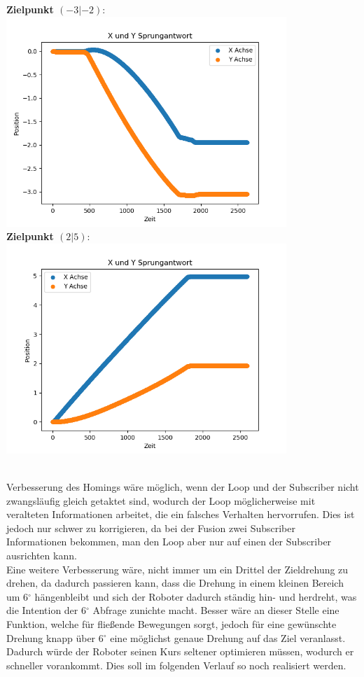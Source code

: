 \documentclass[12pt, a4paper]{report}
\begin{document}
\begin{centering}
{\textbf{Zielpunkt $(-3|-2):$}}\\
\includegraphics[width=300pt]{Sprungantwort1.png}\\
\newpage
{\textbf{Zielpunkt $(2|5):$}}\\
\includegraphics[width=300pt]{Sprungantwort2.png}\\
\end{centering}
~\\

Verbesserung des Homings wäre möglich, wenn der Loop und der Subscriber nicht zwangsläufig gleich getaktet sind, wodurch der Loop möglicherweise mit veralteten Informationen arbeitet, die ein falsches Verhalten hervorrufen. Dies ist jedoch nur schwer zu korrigieren, da bei der Fusion zwei Subscriber Informationen bekommen, man den Loop aber nur auf einen der Subscriber ausrichten kann.\\
Eine weitere Verbesserung wäre, nicht immer um ein Drittel der Zieldrehung zu drehen, da dadurch passieren kann, dass die Drehung in einem kleinen Bereich um 6$^\circ$ hängenbleibt und sich der Roboter dadurch ständig hin- und herdreht, was die Intention der 6$^\circ$ Abfrage zunichte macht. Besser wäre an dieser Stelle eine Funktion, welche für fließende Bewegungen sorgt, jedoch für eine gewünschte Drehung knapp über 6$^\circ$ eine möglichst genaue Drehung auf das Ziel veranlasst. Dadurch würde der Roboter seinen Kurs seltener optimieren müssen, wodurch er schneller vorankommt. Dies soll im folgenden Verlauf so noch realisiert werden.
\end{document}
